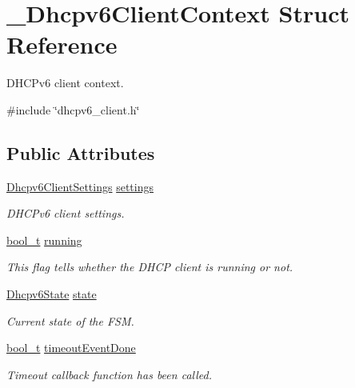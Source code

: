 \hypertarget{struct__Dhcpv6ClientContext}{}\section{\+\_\+\+Dhcpv6\+Client\+Context Struct Reference}
\label{struct__Dhcpv6ClientContext}


D\+H\+C\+Pv6 client context.  




{\ttfamily \#include \char`\"{}dhcpv6\+\_\+client.\+h\char`\"{}}

\subsection*{Public Attributes}
\begin{DoxyCompactItemize}
\item 
\hyperlink{structDhcpv6ClientSettings}{Dhcpv6\+Client\+Settings} \hyperlink{struct__Dhcpv6ClientContext_ad5fdaa3e9366ce6aeb7038a9e0bd6ff0}{settings}
\begin{DoxyCompactList}\small\item\em D\+H\+C\+Pv6 client settings. \end{DoxyCompactList}\item 
\hyperlink{compiler__port_8h_a812d16e5494522586b3784e55d479912}{bool\+\_\+t} \hyperlink{struct__Dhcpv6ClientContext_acf9afe26f2d131279a3800ed41e57eff}{running}
\begin{DoxyCompactList}\small\item\em This flag tells whether the D\+H\+CP client is running or not. \end{DoxyCompactList}\item 
\hyperlink{dhcpv6__client_8h_a8610bfd009af9756638a193136ef93f9}{Dhcpv6\+State} \hyperlink{struct__Dhcpv6ClientContext_a0165e7c93462103ace66d9b4a0ba10cf}{state}
\begin{DoxyCompactList}\small\item\em Current state of the F\+SM. \end{DoxyCompactList}\item 
\hyperlink{compiler__port_8h_a812d16e5494522586b3784e55d479912}{bool\+\_\+t} \hyperlink{struct__Dhcpv6ClientContext_a9201218dcff78572d9a55cf3d980444c}{timeout\+Event\+Done}
\begin{DoxyCompactList}\small\item\em Timeout callback function has been called. \end{DoxyCompactList}\item 

\end{DoxyCompactItemize}
